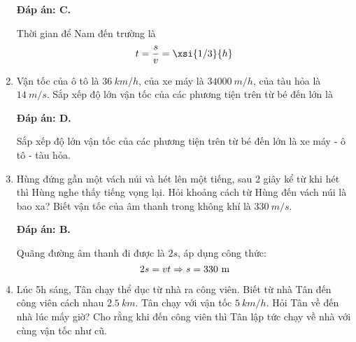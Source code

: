 \begin{enumerate}[label=\bfseries Câu \arabic*:]
	\hideall
	{\textbf{Đáp án: C.}
		
		Thời gian để Nam đến trường là
		$$t=\dfrac{s}{v} = \xsi{1/3}{h}$$
	}
	\item {}
	
	
	{Vận tốc của ô tô là $\SI{36}{km/h}$, của xe máy là $\SI{34000}{m/h}$, của tàu hỏa là $\SI{14}{m/s}$. Sắp xếp độ lớn vận tốc của các phương tiện trên từ bé đến lớn là
		
		
	}
	
	\hideall
	{\textbf{Đáp án: D.}
		
		Sắp xếp độ lớn vận tốc của các phương tiện trên từ bé đến lớn là xe máy - ô tô - tàu hỏa.
	}
	\item {}
	
	
	{Hùng đứng gần một vách núi và hét lên một tiếng, sau 2 giây kể từ khi hét thì Hùng nghe thấy tiếng vọng lại. Hỏi khoảng cách từ Hùng đến vách núi là bao xa? Biết vận tốc của âm thanh trong không khí là $\SI{330}{m/s}$.
		
		
	}
	
	\hideall
	{\textbf{Đáp án: B.}
		
		Quãng đường âm thanh đi được là $2s$, áp dụng công thức:
		$$2s=vt \Rightarrow s = 330\ \text m$$
	}
	\item {}
	
	
	{Lúc 5h sáng, Tân chạy thể dục từ nhà ra công viên. Biết từ nhà Tân đến công viên cách nhau $\SI{2.5}{km}$. Tân chạy với vận tốc $\SI{5}{km/h}$. Hỏi Tân về đến nhà lúc mấy giờ? Cho rằng khi đến công viên thì Tân lập tức chạy về nhà với cùng vận tốc như cũ.
		
		
}
\end{enumerate}
